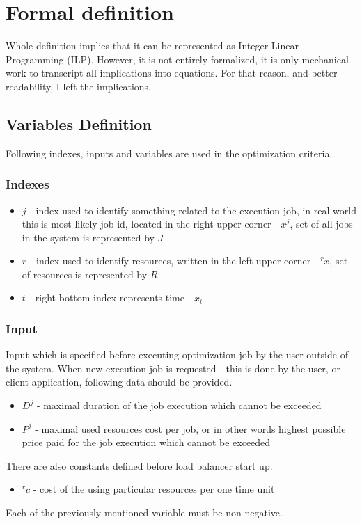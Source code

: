 
\section{Formal definition}\label{sec:formal-definition}
Whole definition implies that it can be represented as Integer Linear Programming (ILP).
However, it is not entirely formalized, 
it is only mechanical work to transcript all implications into equations.
For that reason, and better readability, I left the implications.

\subsection{Variables Definition}\label{subsec:variables-definition}
Following indexes, inputs and variables are used in the optimization criteria.

\subsubsection{Indexes}
\begin{itemize}
	\item $j$ - index used to identify something related to the execution job,
	      in real world this is most likely job id, located in the right upper corner - $x^{j}$, 
	      set of all jobs in the system is represented by $J$
	\item $r$ - index used to identify resources, written in the left upper corner - ${}^{r}x$, set of resources is represented by $R$
	\item $t$ - right bottom index represents time - $x_t$
\end{itemize}

\subsubsection{Input}\label{subsubsec:formal-input}
Input which is specified before executing optimization job by the user outside of the system.
When new execution job is requested - this is done by the user, or client application,
following data should be provided.
\begin{itemize}
	\item $D^{j}$ - maximal duration of the job execution which cannot be exceeded
	\item $P^{j}$ - maximal used resources cost per job, or in other words highest possible price paid for the job execution which cannot be exceeded
\end{itemize} 
There are also constants defined before load balancer start up.
\begin{itemize}
	\item ${}^{r}c$ - cost of the using particular resources per one time unit
\end{itemize}
Each of the previously mentioned variable must be non-negative.

